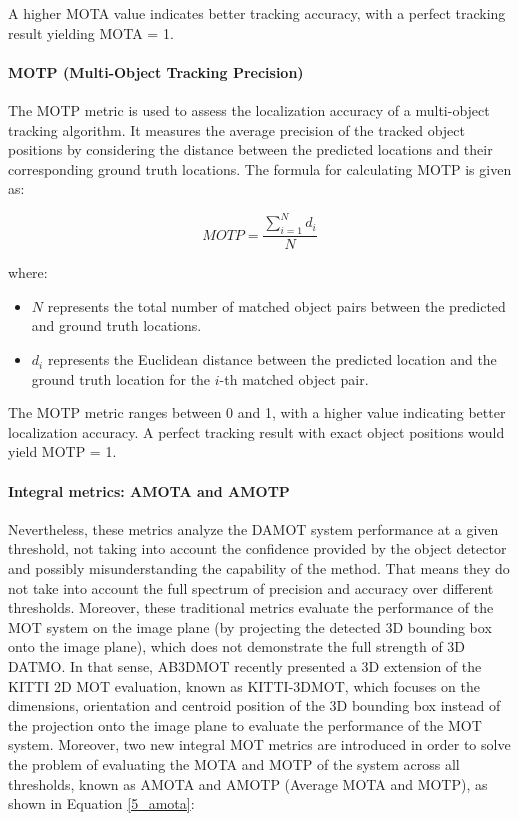 A higher MOTA value indicates better tracking accuracy, with a perfect tracking result yielding MOTA = 1.

\paragraph{MOTP (Multi-Object Tracking Precision)}

The MOTP metric is used to assess the localization accuracy of a multi-object tracking algorithm. It measures the average precision of the tracked object positions by considering the distance between the predicted locations and their corresponding ground truth locations. The formula for calculating MOTP is given as:

\[
MOTP = \frac{{\sum_{{i=1}}^{{N}} d_i}}{{N}}
\]

where:
\begin{itemize}
	\item \(N\) represents the total number of matched object pairs between the predicted and ground truth locations.
	\item \(d_i\) represents the Euclidean distance between the predicted location and the ground truth location for the \(i\)-th matched object pair.
\end{itemize}

The MOTP metric ranges between 0 and 1, with a higher value indicating better localization accuracy. A perfect tracking result with exact object positions would yield MOTP = 1.

\paragraph{Integral metrics: AMOTA and AMOTP}

Nevertheless, these metrics analyze the DAMOT system performance at a given threshold, not taking into account the confidence provided by the object detector and possibly misunderstanding the capability of the method. That means they do not take into account the full spectrum of precision and accuracy over different thresholds. Moreover, these traditional metrics evaluate the performance of the MOT system on the image plane (by projecting the detected 3D bounding box onto the image plane), which does not demonstrate the full strength of 3D DATMO. In that sense, AB3DMOT \cite{weng20203d} recently presented a 3D extension of the KITTI 2D MOT evaluation, known as KITTI-3DMOT, which focuses on the dimensions, orientation and centroid position of the 3D bounding box instead of the projection onto the image plane to evaluate the performance of the MOT system. Moreover, two new integral MOT metrics are introduced in order to solve the problem of evaluating the MOTA and MOTP of the system across all thresholds, known as AMOTA and AMOTP (Average MOTA and MOTP), as shown in Equation \ref{5_amota}:

